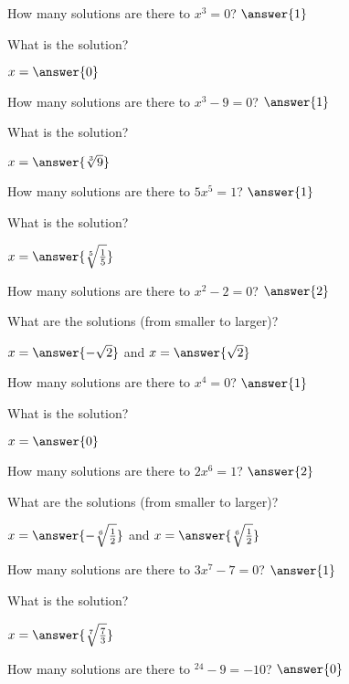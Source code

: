 \documentclass{ximera}
\author{Kenneth Berglund}
\begin{document}
\begin{exercise}
How many solutions are there to $x^3=0$? $\answer{1}$
\begin{exercise}
What is the solution?

$x=\answer{0}$
\end{exercise}
\end{exercise}

\begin{exercise}
How many solutions are there to $x^3-9=0$? $\answer{1}$
\begin{exercise}
What is the solution?

$x=\answer{\sqrt[3]{9}}$
\end{exercise}
\end{exercise}

\begin{exercise}
How many solutions are there to $5x^5=1$? $\answer{1}$
\begin{exercise}
What is the solution?

$x=\answer{\sqrt[5]{\frac{1}{5}}}$
\end{exercise}
\end{exercise}

\begin{exercise}
How many solutions are there to $x^2 - 2=0$? $\answer{2}$
\begin{exercise}
What are the solutions (from smaller to larger)?

$x=\answer{-\sqrt{2}}$ and $x = \answer{\sqrt{2}}$
\end{exercise}
\end{exercise}

\begin{exercise}
How many solutions are there to $x^4=0$? $\answer{1}$
\begin{exercise}
What is the solution?

$x=\answer{0}$
\end{exercise}
\end{exercise}

\begin{exercise}
How many solutions are there to $2x^6=1$? $\answer{2}$
\begin{exercise}
What are the solutions (from smaller to larger)?

$x=\answer{-\sqrt[6]{\frac{1}{2}}}$ and $x=\answer{\sqrt[6]{\frac{1}{2}}}$
\end{exercise}
\end{exercise}

\begin{exercise}
How many solutions are there to $3x^7-7=0$? $\answer{1}$
\begin{exercise}
What is the solution?

$x=\answer{\sqrt[7]{\frac{7}{3}}}$
\end{exercise}
\end{exercise}

\begin{exercise}
How many solutions are there to $^{24} -9=-10$? $\answer{0}$

\end{exercise}
\end{document}
